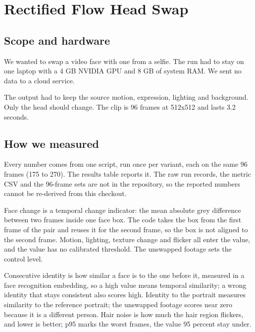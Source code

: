 
\section{Rectified Flow Head Swap}

\subsection{Scope and hardware}
We wanted to swap a video face with one from a selfie. The run had to stay on one laptop with a 4 GB NVIDIA GPU and 8 GB of system RAM. We sent no data to a cloud service.

The output had to keep the source motion, expression, lighting and background. Only the head should change. The clip is 96 frames at 512x512 and lasts 3.2 seconds.

\subsection{How we measured}
Every number comes from one script, run once per variant, each on the same 96 frames (175 to 270). The results table reports it. The raw run records, the metric CSV and the 96-frame sets are not in the repository, so the reported numbers cannot be re-derived from this checkout.

Face change is a temporal change indicator: the mean absolute grey difference between two frames inside one face box. The code takes the box from the first frame of the pair and reuses it for the second frame, so the box is not aligned to the second frame. Motion, lighting, texture change and flicker all enter the value, and the value has no calibrated threshold. The unswapped footage sets the control level.

Consecutive identity is how similar a face is to the one before it, measured in a face recognition embedding, so a high value means temporal similarity; a wrong identity that stays consistent also scores high. Identity to the portrait measures similarity to the reference portrait; the unswapped footage scores near zero because it is a different person. Hair noise is how much the hair region flickers, and lower is better; p95 marks the worst frames, the value 95 percent stay under.

